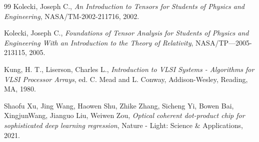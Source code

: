 \documentclass[12pt,openany]{book}
\theoremstyle{definition}
\begin{document}
\begin{thebibliography}{99}
Kolecki, Joseph C., \textit{An Introduction to Tensors for Students of Physics and Engineering}, NASA/TM-2002-211716, 2002.

Kolecki, Joseph C., \textit{Foundations of Tensor Analysis for Students of Physics and Engineering With an Introduction
to the Theory of Relativity}, NASA/TP—2005-213115, 2005.

Kung, H. T., Liserson, Charles L., \textit{Introduction to VLSI Systems - Algorithms for VLSI Processor Arrays}, ed. C. Mead and L. Conway, Addison-Wesley, Reading, MA, 1980.

Shaofu Xu, Jing Wang, Haowen Shu, Zhike Zhang, Sicheng Yi, Bowen Bai, XingjunWang, Jianguo Liu, Weiwen Zou, \textit{Optical coherent dot-product chip for sophisticated deep learning regression}, Nature - Light: Science \& Applications, 2021.

\end{thebibliography}
\end{document}
